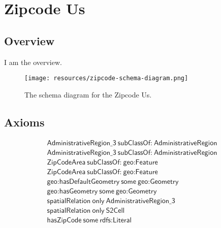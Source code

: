 
\section{Zipcode Us}
\label{sec:zipcode-us}
\subsection{Overview}
\label{ssec:overview}

I am the overview.

\begin{figure}[h!]
  \begin{center}
    \texttt{[image: resources/zipcode-schema-diagram.png]}
  \end{center}
  \caption{The schema diagram for the Zipcode Us.}
  \label{fig:ov-diagram}
\end{figure}


\subsection{Axioms}
\begin{align}
  \textsf{AdministrativeRegion\_3}~\textsf{subClassOf:}~\textsf{AdministrativeRegion}\\
  \textsf{AdministrativeRegion\_3}~\textsf{subClassOf:}~\textsf{AdministrativeRegion}\\
  \textsf{ZipCodeArea}~\textsf{subClassOf:}~\textsf{geo:Feature}\\
  \textsf{ZipCodeArea}~\textsf{subClassOf:}~\textsf{geo:Feature}\\
  \textsf{geo:hasDefaultGeometry}~\textsf{some}~\textsf{geo:Geometry}\\
  \textsf{geo:hasGeometry}~\textsf{some}~\textsf{geo:Geometry}\\
  \textsf{spatialRelation}~\textsf{only}~\textsf{AdministrativeRegion\_3}\\
  \textsf{spatialRelation}~\textsf{only}~\textsf{S2Cell}\\
  \textsf{hasZipCode}~\textsf{some}~\textsf{rdfs:Literal}\end{align}



